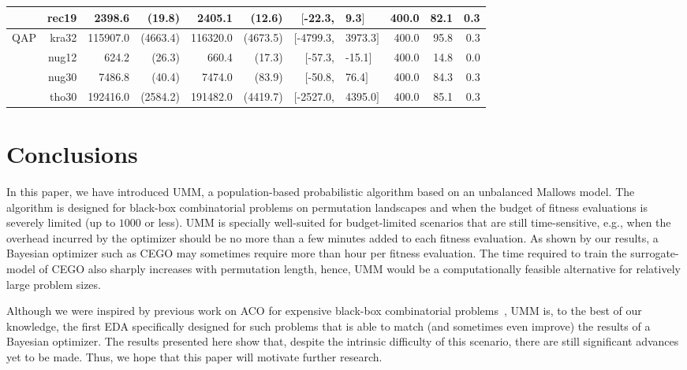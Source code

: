 \documentclass[runningheads]{llncs}
\begin{document}
\begin{table}[tb]
{\begin{tabular}{r@{\hskip -2ex}*{5}{r}rl@{\hskip -2ex}*{3}{r}}
       & rec19        & 2398.6                  & (19.8)     & 2405.1    & (12.6)                 & $[$-22.3,     & 9.3$]$        & 400.0& 82.1 & 0.3  \\\midrule
    QAP     & kra32        & 115907.0                & (4663.4)   & 116320.0  & (4673.5)               & $[$-4799.3,   & 3973.3$]$     & 400.0& 95.8 & 0.3  \\
        & nug12        & 624.2                   & (26.3)     & 660.4     & (17.3)                 & $[$-57.3,     & -15.1$]$      & 400.0& 14.8 & 0.0  \\
        & nug30        & 7486.8                  & (40.4)     & 7474.0    & (83.9)                 & $[$-50.8,     & 76.4$]$       & 400.0& 84.3 & 0.3  \\
        & tho30        & 192416.0                & (2584.2)   & 191482.0  & (4419.7)               & $[$-2527.0,   & 4395.0$]$     & 400.0& 85.1 & 0.3  \\
\bottomrule
\end{tabular}}
\end{table}




\section{Conclusions}

In this paper, we have introduced UMM, a population-based probabilistic
algorithm based on an unbalanced Mallows model. The algorithm is designed for
black-box combinatorial problems on permutation landscapes and when the budget
of fitness evaluations is severely limited (up to $1000$ or less).  UMM is
specially well-suited for budget-limited scenarios that are still
time-sensitive, e.g., when the overhead incurred by the optimizer should be no
more than a few minutes added to each fitness evaluation. As shown by our
results, a Bayesian optimizer such as CEGO may sometimes require more than hour
per fitness evaluation. The time required to train the surrogate-model of CEGO
also sharply increases with permutation length, hence, UMM would be a
computationally feasible alternative for relatively large problem sizes.

Although we were inspired by previous work on ACO for expensive black-box
combinatorial problems~\citep{PerLopStu2015si}, UMM is, to the best of our
knowledge, the first EDA specifically designed for such problems that is able
to match (and sometimes even improve) the results of a Bayesian optimizer. The
results presented here show that, despite the intrinsic difficulty of this scenario, there are still significant advances yet to be made. Thus, we hope
that this paper will motivate further research. %
\end{document}
